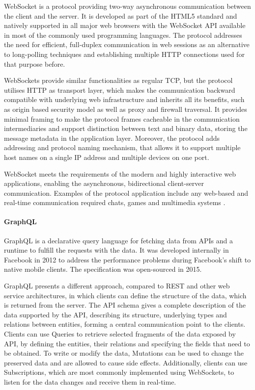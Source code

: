 WebSocket \cite{WebSocketRFC} is a protocol providing two-way asynchronous communication between the client and the server. It is developed as part of the HTML5 standard and natively supported in all major web browsers with the WebSocket API available in most of the commonly used programming languages. The protocol addresses the need for efficient, full-duplex communication in web sessions as an alternative to long-polling techniques and establishing multiple HTTP connections used for that purpose before.

WebSockets provide similar functionalities as regular TCP, but the protocol utilises HTTP as transport layer, which makes the communication backward compatible with underlying web infrastructure and inherits all its benefits, such as origin based security model as well as proxy and firewall traversal. It provides minimal framing to make the protocol frames cacheable in the communication intermediaries and support distinction between text and binary data, storing the message metadata in the application layer. Moreover, the protocol adds addressing and protocol naming mechanism, that allows it to support multiple host names on a single IP address and multiple devices on one port.

WebSocket meets the requirements of the modern and highly interactive web applications, enabling the asynchronous, bidirectional client-server communication. Examples of the protocol application include any web-based and real-time communication required chats, games and multimedia systems \cite{PerfomranceEvaluationonWebsocketProtocol}.

\paragraph*{GraphQL}

GraphQL \cite{GraphQL} is a declarative query language for fetching data from APIs and a runtime to fulfill the requests with the data. It was developed internally in Facebook in 2012 to address the performance problems during Facebook's shift to native mobile clients. The specification was open-sourced in 2015.

GraphQL presents a different approach, compared to REST and other web service architectures, in which clients can define the structure of the data, which is returned from the server. The API schema gives a complete description of the data supported by the API, describing its structure, underlying types and relations between entities, forming a central communication point to the clients.
Clients can use Queries to retrieve selected fragments of the data exposed by API, by defining the entities, their relations and specifying the fields that need to be obtained. To write or modify the data, Mutations can be used to change the preserved data and are allowed to cause side effects.
Additionally, clients can use Subscriptions, which are most commonly implemented using WebSockets, to listen for the data changes and receive them in real-time.

